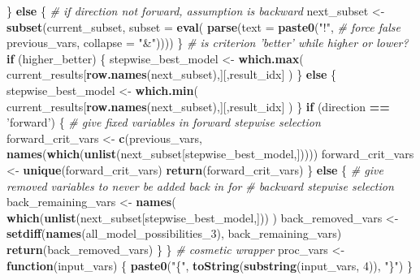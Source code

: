 \documentclass[
]{article}
\newenvironment{Shaded}{\begin{snugshade}}{\end{snugshade}}
\newcommand{\CommentTok}[1]{\textcolor[rgb]{0.56,0.35,0.01}{\textit{#1}}}
\newcommand{\ControlFlowTok}[1]{\textcolor[rgb]{0.13,0.29,0.53}{\textbf{#1}}}
\newcommand{\DataTypeTok}[1]{\textcolor[rgb]{0.13,0.29,0.53}{#1}}
\newcommand{\DecValTok}[1]{\textcolor[rgb]{0.00,0.00,0.81}{#1}}
\newcommand{\KeywordTok}[1]{\textcolor[rgb]{0.13,0.29,0.53}{\textbf{#1}}}
\newcommand{\NormalTok}[1]{#1}
\newcommand{\OperatorTok}[1]{\textcolor[rgb]{0.81,0.36,0.00}{\textbf{#1}}}
\newcommand{\StringTok}[1]{\textcolor[rgb]{0.31,0.60,0.02}{#1}}
\begin{document}
\begin{Shaded}
\begin{Highlighting}[]
\NormalTok{  \} }\ControlFlowTok{else}\NormalTok{ \{}
    \CommentTok{# if direction not forward, assumption is backward}
\NormalTok{    next_subset <-}\StringTok{ }\KeywordTok{subset}\NormalTok{(current_subset,}
                          \DataTypeTok{subset =} \KeywordTok{eval}\NormalTok{(}
                            \KeywordTok{parse}\NormalTok{(}\DataTypeTok{text =} \KeywordTok{paste0}\NormalTok{(}\StringTok{"!"}\NormalTok{,  }\CommentTok{# force false}
\NormalTok{                                                previous_vars,}
                                                \DataTypeTok{collapse =} \StringTok{"&"}\NormalTok{))))}
\NormalTok{  \}}
  \CommentTok{# is criterion 'better' while higher or lower?}
  \ControlFlowTok{if}\NormalTok{ (higher_better) \{}
\NormalTok{    stepwise_best_model <-}\StringTok{ }\KeywordTok{which.max}\NormalTok{(}
\NormalTok{      current_results[}\KeywordTok{row.names}\NormalTok{(next_subset),][,result_idx]}
\NormalTok{      )}
\NormalTok{  \} }\ControlFlowTok{else}\NormalTok{ \{}
\NormalTok{    stepwise_best_model <-}\StringTok{ }\KeywordTok{which.min}\NormalTok{(}
\NormalTok{      current_results[}\KeywordTok{row.names}\NormalTok{(next_subset),][,result_idx]}
\NormalTok{      )}
\NormalTok{  \}}
  \ControlFlowTok{if}\NormalTok{ (direction }\OperatorTok{==}\StringTok{ 'forward'}\NormalTok{) \{}
    \CommentTok{# give fixed variables in forward stepwise selection}
\NormalTok{    forward_crit_vars <-}\StringTok{ }\KeywordTok{c}\NormalTok{(previous_vars,}
                           \KeywordTok{names}\NormalTok{(}\KeywordTok{which}\NormalTok{(}\KeywordTok{unlist}\NormalTok{(next_subset[stepwise_best_model,]))))}
\NormalTok{    forward_crit_vars <-}\StringTok{ }\KeywordTok{unique}\NormalTok{(forward_crit_vars)}
    \KeywordTok{return}\NormalTok{(forward_crit_vars)}
\NormalTok{  \} }\ControlFlowTok{else}\NormalTok{ \{}
    \CommentTok{# give removed variables to never be added back in for}
    \CommentTok{# backward stepwise selection}
\NormalTok{    back_remaining_vars <-}\StringTok{ }\KeywordTok{names}\NormalTok{(}
      \KeywordTok{which}\NormalTok{(}\KeywordTok{unlist}\NormalTok{(next_subset[stepwise_best_model,]))}
\NormalTok{      )}
\NormalTok{    back_removed_vars <-}\StringTok{ }\KeywordTok{setdiff}\NormalTok{(}\KeywordTok{names}\NormalTok{(all_model_possibilities_}\DecValTok{3}\NormalTok{),}
\NormalTok{                                 back_remaining_vars)}
    \KeywordTok{return}\NormalTok{(back_removed_vars)}
\NormalTok{  \}}
\NormalTok{\}}
\CommentTok{# cosmetic wrapper}
\NormalTok{proc_vars <-}\StringTok{ }\ControlFlowTok{function}\NormalTok{(input_vars) \{}
  \KeywordTok{paste0}\NormalTok{(}\StringTok{"\{"}\NormalTok{, }\KeywordTok{toString}\NormalTok{(}\KeywordTok{substring}\NormalTok{(input_vars, }\DecValTok{4}\NormalTok{)), }\StringTok{"\}"}\NormalTok{)}
\NormalTok{\}}
\end{Highlighting}
\end{Shaded}
\end{document}

